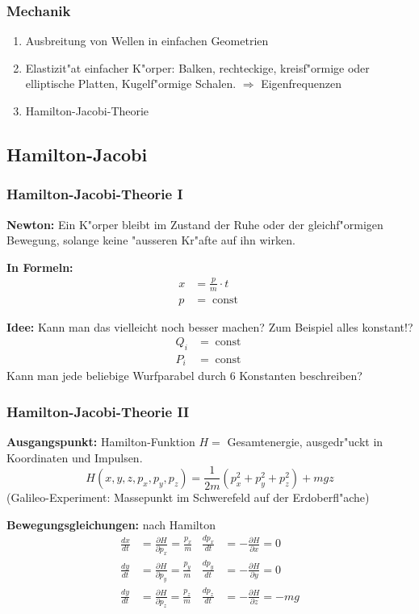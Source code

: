 \documentclass{beamer}
\begin{document}
\begin{frame}
\frametitle{Mechanik}
\begin{enumerate}
\item Ausbreitung von Wellen in einfachen Geometrien
\item Elastizit"at einfacher K"orper: Balken, rechteckige, kreisf"ormige
oder elliptische Platten, Kugelf"ormige Schalen. $\Rightarrow$ Eigenfrequenzen
\item Hamilton-Jacobi-Theorie
\end{enumerate}
\end{frame}

\begin{frame}
\section{Hamilton-Jacobi}
\frametitle{Hamilton-Jacobi-Theorie I}
{\bf Newton:} Ein K"orper bleibt im Zustand der Ruhe oder der gleichf"ormigen
Bewegung, solange keine "ausseren Kr"afte auf ihn wirken. 

{\bf In Formeln:}
\begin{align*}
x&=\frac{p}{m}\cdot t\\
p&=\operatorname{const}
\end{align*}

{\bf Idee:} Kann man das vielleicht noch besser machen? Zum Beispiel alles konstant!?
\begin{align*}
Q_i&=\operatorname{const}\\
P_i&=\operatorname{const}
\end{align*}
Kann man jede beliebige Wurfparabel durch 6 Konstanten beschreiben?
\end{frame}

\begin{frame}
\frametitle{Hamilton-Jacobi-Theorie II}

{\bf Ausgangspunkt:}
Hamilton-Funktion $H=$ Gesamtenergie, ausgedr"uckt in Koordinaten
und Impulsen. 
\[
H(x,y,z,p_x,p_y,p_z)=\frac1{2m}(p_x^2+p_y^2+p_z^2)+mgz
\]
(Galileo-Experiment: Massepunkt im Schwerefeld auf der Erdoberfl"ache)

{\bf Bewegungsgleichungen:} nach Hamilton
\begin{align*}
\frac{dx}{dt}&=\frac{\partial H}{\partial p_x}=\frac{p_x}{m}&
\frac{dp_x}{dt}&=-\frac{\partial H}{\partial x}=0\\
\frac{dy}{dt}&=\frac{\partial H}{\partial p_y}=\frac{p_y}{m}&
\frac{dp_y}{dt}&=-\frac{\partial H}{\partial y}=0\\
\frac{dy}{dt}&=\frac{\partial H}{\partial p_z}=\frac{p_z}{m}&
\frac{dp_z}{dt}&=-\frac{\partial H}{\partial z}=-mg
\end{align*}

\end{frame}
\end{document}
